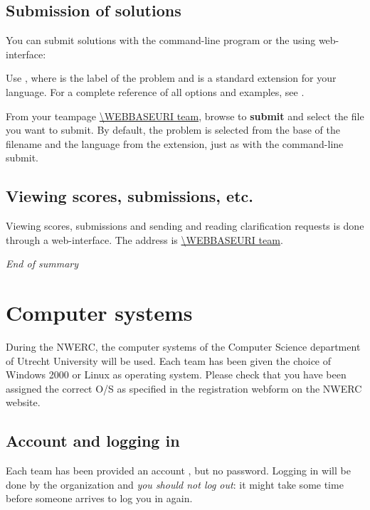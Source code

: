 \subsection{Submission of solutions}

You can submit solutions with the command-line program  or
the using web-interface:
\begin{description}[\breaklabel\setlabelstyle{\bfseries}]
\item[Command-line] 
Use , where  is the
label of the problem and  is a standard extension for
your language.  For a complete reference of all options and examples,
see .
\item[Web-interface]
From your teampage \url{\WEBBASEURI team}, browse to
\textbf{submit} and select the file you want to submit. By default,
the problem is selected from the base of the filename and the language
from the extension, just as with the command-line submit.
\end{description}

\subsection{Viewing scores, submissions, etc.}

Viewing scores, submissions and sending and reading clarification
requests is done through a web-interface. The address is
\url{\WEBBASEURI team}.

\emph{End of summary}

\newpage

\section{Computer systems}

During the NWERC, the computer systems of the Computer Science
department of Utrecht University will be used. Each team has been
given the choice of Windows 2000 or Linux as operating system. Please
check that you have been assigned the correct O/S as specified in the
registration webform on the NWERC website.

\subsection{Account and logging in}

Each team has been provided an account , but no password.
Logging in will be done by the organization and \emph{you should not
  log out}: it might take some time before someone arrives to log you
in again.

